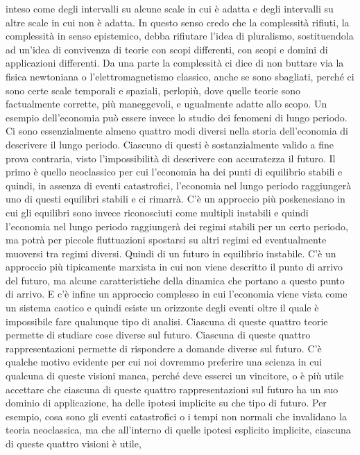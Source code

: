 \documentclass[a4paper, headings=standardclasses]{scrartcl}
\begin{document}
inteso come degli intervalli su alcune scale in cui è adatta e degli intervalli su altre scale in cui non è adatta.
In questo senso credo che la complessità rifiuti, la complessità in senso epistemico, debba rifiutare l'idea di pluralismo,
sostituendola ad un'idea di convivenza di teorie con scopi differenti, con scopi e domini di applicazioni differenti.
Da una parte la complessità ci dice di non buttare via la fisica newtoniana o l'elettromagnetismo classico, anche se sono sbagliati,
perché ci sono certe scale temporali e spaziali, perlopiù, dove quelle teorie sono factualmente corrette, più maneggevoli,
e ugualmente adatte allo scopo.
Un esempio dell'economia può essere invece lo studio dei fenomeni di lungo periodo.
Ci sono essenzialmente almeno quattro modi diversi nella storia dell'economia di descrivere il lungo periodo.
Ciascuno di questi è sostanzialmente valido a fine prova contraria, visto l'impossibilità di descrivere con accuratezza il futuro.
Il primo è quello neoclassico per cui l'economia ha dei punti di equilibrio stabili e quindi, in assenza di eventi catastrofici,
l'economia nel lungo periodo raggiungerà uno di questi equilibri stabili e ci rimarrà.
C'è un approccio più poskenesiano in cui gli equilibri sono invece riconosciuti come multipli instabili
e quindi l'economia nel lungo periodo raggiungerà dei regimi stabili per un certo periodo,
ma potrà per piccole fluttuazioni spostarsi su altri regimi ed eventualmente muoversi tra regimi diversi.
Quindi di un futuro in equilibrio instabile.
C'è un approccio più tipicamente marxista in cui non viene descritto il punto di arrivo del futuro,
ma alcune caratteristiche della dinamica che portano a questo punto di arrivo.
E c'è infine un approccio complesso in cui l'economia viene vista come un sistema caotico
e quindi esiste un orizzonte degli eventi oltre il quale è impossibile fare qualunque tipo di analisi.
Ciascuna di queste quattro teorie permette di studiare cose diverse sul futuro.
Ciascuna di queste quattro rappresentazioni permette di rispondere a domande diverse sul futuro.
C'è qualche motivo evidente per cui noi dovremmo preferire una scienza in cui
qualcuna di queste visioni manca, perché deve esserci un vincitore,
o è più utile accettare che ciascuna di queste quattro rappresentazioni
sul futuro ha un suo dominio di applicazione, ha delle ipotesi implicite su che tipo di futuro.
Per esempio, cosa sono gli eventi catastrofici o i tempi non normali che invalidano la teoria neoclassica,
ma che all'interno di quelle ipotesi esplicito implicite, ciascuna di queste quattro visioni è utile,
\end{document}
